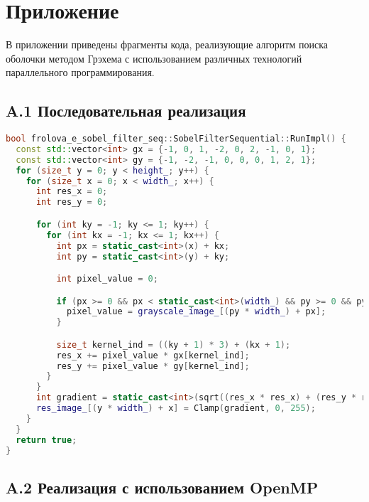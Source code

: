 \documentclass{report}
\begin{document}
\newpage
\section*{Приложение}
\justifying

В приложении приведены фрагменты кода, реализующие алгоритм поиска оболочки методом Грэхема с использованием различных технологий параллельного программирования.

\subsection*{A.1 Последовательная реализация}

\begin{lstlisting}[language=C++,caption={Sequential Version}]
bool frolova_e_sobel_filter_seq::SobelFilterSequential::RunImpl() {
  const std::vector<int> gx = {-1, 0, 1, -2, 0, 2, -1, 0, 1};
  const std::vector<int> gy = {-1, -2, -1, 0, 0, 0, 1, 2, 1};
  for (size_t y = 0; y < height_; y++) {
    for (size_t x = 0; x < width_; x++) {
      int res_x = 0;
      int res_y = 0;

      for (int ky = -1; ky <= 1; ky++) {
        for (int kx = -1; kx <= 1; kx++) {
          int px = static_cast<int>(x) + kx;
          int py = static_cast<int>(y) + ky;

          int pixel_value = 0;

          if (px >= 0 && px < static_cast<int>(width_) && py >= 0 && py < static_cast<int>(height_)) {
            pixel_value = grayscale_image_[(py * width_) + px];
          }

          size_t kernel_ind = ((ky + 1) * 3) + (kx + 1);
          res_x += pixel_value * gx[kernel_ind];
          res_y += pixel_value * gy[kernel_ind];
        }
      }
      int gradient = static_cast<int>(sqrt((res_x * res_x) + (res_y * res_y)));
      res_image_[(y * width_) + x] = Clamp(gradient, 0, 255);
    }
  }
  return true;
}
\end{lstlisting}

\subsection*{A.2 Реализация с использованием OpenMP}
\end{document}

